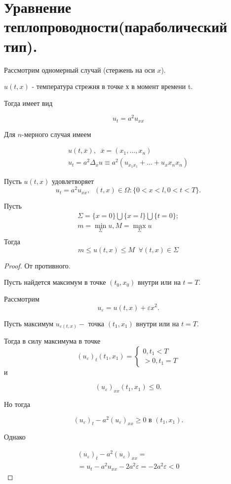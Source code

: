 \chapter{Уравнение теплопроводности(параболический тип).}
\label{cha:30}

Рассмотрим одномерный случай (стержень на оси $x$).

$u(t,x)$ - температура стрежня в точке х в момент времени t.

Тогда  имеет вид

\[
u_t = a^2u_{xx}\]

Для $n$-мерного случая имеем

\begin{gather*}
	u(t,\overline{x}),\;\; \overline{x} = (x_1, ..., x_n) \\
u_t = a^2\Delta_xu \equiv a^2(u_{x_1x_1}+...+u_x{x_nx_n})
\end{gather*}

\begin{theorem}
	Пусть $u(t,x)$ удовлетворяет 
	\[
	u_t=a^2u_{xx}, \;\; (t,x) \in \Omega: \{0<x<l, 0<t<T\}.\]

	Пусть 
	\begin{gather*}
		\Sigma = \{x = 0\}\bigcup\{x = l\}\bigcup \{t=0\};\\
	m = \min\limits_{\Sigma}u, M = \max\limits_{\Sigma}u \\
	\end{gather*}
	Тогда \[m \leq u(t,x) \leq M\;\; \forall (t,x) \in \Sigma\]
		
	
\end{theorem}

\begin{proof}
	От противного.

	Пусть найдется максимум в точке $(t_0, x_0)$ внутри или на $t = T.$

	Рассмотрим \[u_{\varepsilon} = u(t,x) + \varepsilon x^2.\]

	Пусть максимум $u_{\varepsilon(t,x)}-$ точка $(t_1, x_1)$ внутри или на $t = T.$

	Тогда в силу максимума в точке
	\[
		(u_{\varepsilon})_t(t_1, x_1) = \begin{cases}
			0, t_1 < T\\
			>0, t_1 = T
		\end{cases}
	\]
	и

	\[(u_{\varepsilon})_{xx}(t_1, x_1)\leq 0.\]

	Но тогда 

	\[
	{(u_{\varepsilon})_t} - {a^2(u_{\varepsilon})_{xx}} \geq 0 \text{ в }  (t_1, x_1).\]

	Однако

	\begin{gather*}
		{(u_{\varepsilon})_t} - {a^2(u_{\varepsilon})_{xx}}=\\
		= u_t- a^2u_{xx}-2a^2\varepsilon = -2a^2\varepsilon <0
	\end{gather*}

\end{proof}

